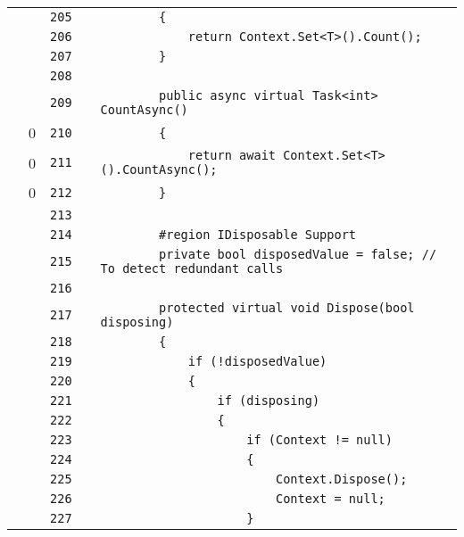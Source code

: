 \documentclass[a4paper,10pt]{article}
\begin{document}
\begin{longtable}[l]{lrrll}
\cellcolor{gray} &  & \verb~205~ & & \verb~        {~\\
\cellcolor{gray} &  & \verb~206~ & & \verb~            return Context.Set<T>().Count();~\\
\cellcolor{gray} &  & \verb~207~ & & \verb~        }~\\
\cellcolor{gray} &  & \verb~208~ & & \verb~~\\
\cellcolor{gray} &  & \verb~209~ & & \verb~        public async virtual Task<int> CountAsync()~\\
\cellcolor{red} & 0 & \verb~210~ & & \verb~        {~\\
\cellcolor{red} & 0 & \verb~211~ & & \verb~            return await Context.Set<T>().CountAsync();~\\
\cellcolor{red} & 0 & \verb~212~ & & \verb~        }~\\
\cellcolor{gray} &  & \verb~213~ & & \verb~~\\
\cellcolor{gray} &  & \verb~214~ & & \verb~        #region IDisposable Support~\\
\cellcolor{gray} &  & \verb~215~ & & \verb~        private bool disposedValue = false; // To detect redundant calls~\\
\cellcolor{gray} &  & \verb~216~ & & \verb~~\\
\cellcolor{gray} &  & \verb~217~ & & \verb~        protected virtual void Dispose(bool disposing)~\\
\cellcolor{gray} &  & \verb~218~ & & \verb~        {~\\
\cellcolor{gray} &  & \verb~219~ & & \verb~            if (!disposedValue)~\\
\cellcolor{gray} &  & \verb~220~ & & \verb~            {~\\
\cellcolor{gray} &  & \verb~221~ & & \verb~                if (disposing)~\\
\cellcolor{gray} &  & \verb~222~ & & \verb~                {~\\
\cellcolor{gray} &  & \verb~223~ & & \verb~                    if (Context != null)~\\
\cellcolor{gray} &  & \verb~224~ & & \verb~                    {~\\
\cellcolor{gray} &  & \verb~225~ & & \verb~                        Context.Dispose();~\\
\cellcolor{gray} &  & \verb~226~ & & \verb~                        Context = null;~\\
\cellcolor{gray} &  & \verb~227~ & & \verb~                    }~\\

\end{longtable}
\end{document}
